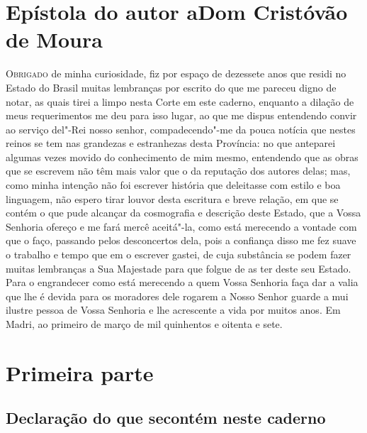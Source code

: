 \chapter[Epístola do autor a Dom Cristóvão de Moura]{Epístola do autor a\break Dom
Cristóvão de Moura}



\textsc{Obrigado} de minha curiosidade, fiz por espaço de dezessete anos que residi no
Estado do Brasil muitas lembranças por escrito do que me pareceu digno de notar, as quais
tirei a limpo nesta Corte em este caderno, enquanto a dilação de meus requerimentos me deu
para isso lugar, ao que me dispus entendendo convir ao serviço del"-Rei nosso senhor,
compadecendo"-me da pouca notícia que nestes reinos se tem nas grandezas e estranhezas
desta Província: no que anteparei algumas vezes movido do conhecimento de mim mesmo,
entendendo que as obras que se escrevem não têm mais valor que o da reputação dos autores
delas; mas, como minha intenção não foi escrever história que deleitasse com estilo e boa
linguagem, não espero tirar louvor desta escritura e breve relação, em que se contém o que
pude alcançar da cosmografia e descrição deste Estado, que a Vossa Senhoria ofereço e me
fará mercê aceitá"-la, como está merecendo a vontade com que o faço, passando pelos
desconcertos dela, pois a confiança disso me fez suave o trabalho e tempo que em o
escrever gastei, de cuja substância se podem fazer muitas lembranças a Sua Majestade para
que folgue de as ter deste seu Estado. Para o engrandecer como está merecendo a quem Vossa
Senhoria faça dar a valia que lhe é devida para os moradores dele rogarem a Nosso Senhor
guarde a mui ilustre pessoa de Vossa Senhoria e lhe acrescente a vida por muitos anos. Em
Madri, ao primeiro de março de mil quinhentos e oitenta e sete.

\chapter[Primeira parte: Roteiro geral]{Primeira parte }

\section[Declaração do que se contém neste caderno]{Declaração do que se\break contém
neste caderno}


